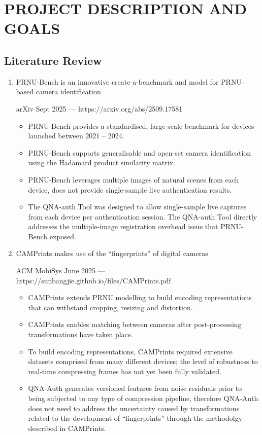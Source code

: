 \chapter{\MakeUppercase{Project Description and Goals}}

\section{Literature Review}

\begin{enumerate}

\item PRNU-Bench is an innovative create-a-benchmark and model for PRNU-based camera identification

arXiv Sept 2025 — https://arxiv.org/abs/2509.17581

\begin{itemize}
\item PRNU-Bench provides a standardised, large-scale benchmark for devices launched between 2021 – 2024.
\item PRNU-Bench supports generalisable and open-set camera identification using the Hadamard product similarity matrix.
\item PRNU-Bench leverages multiple images of natural scenes from each device, does not provide single-sample live authentication results.
\item The QNA-auth Tool was designed to allow single-sample live captures from each device per authentication session. The QNA-auth Tool directly addresses the multiple-image registration overhead issue that PRNU-Bench exposed.
\end{itemize}

\item CAMPrints makes use of the ``fingerprints'' of digital cameras

ACM MobiSys June 2025 — https://sunbangjie.github.io/files/CAMPrints.pdf

\begin{itemize}
\item CAMPrints extends PRNU modelling to build encoding representations that can withstand cropping, resizing and distortion.
\item CAMPrints enables matching between cameras after post-processing transformations have taken place.
\item To build encoding representations, CAMPrints required extensive datasets comprised from many different devices; the level of robustness to real-time compressing frames has not yet been fully validated.
\item QNA-Auth generates versioned features from noise residuals prior to being subjected to any type of compression pipeline, therefore QNA-Auth does not need to address the uncertainty caused by transformations related to the development of ``fingerprints'' through the methodolgy described in CAMPrints.
\end{itemize}


\end{enumerate}
